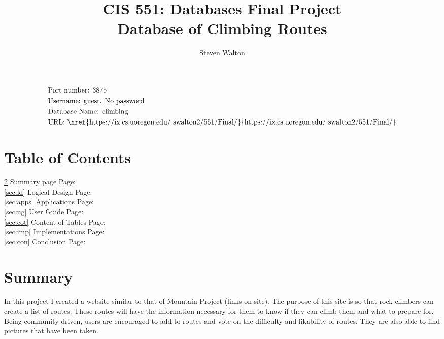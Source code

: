 \documentclass[12pt,letter]{article}
\begin{document}
\title{CIS 551: Databases Final Project\\
\large Database of Climbing Routes}
\author{Steven Walton}
\maketitle

\section*{}
\begin{align*}
    &\text{Port number: }3875 \\
    &\text{Username: guest. No password}\\
    &\text{Database Name: climbing}\\
    &\text{URL:
    \href{https://ix.cs.uoregon.edu/~swalton2/551/Final/}{https://ix.cs.uoregon.edu/~swalton2/551/Final/}}\\
\end{align*}
\newpage
\section{Table of Contents}
\ref{sec:sum} Summary page      \hspace*{\fill}Page:\pageref{sec:sum}\\
\ref{sec:ld} Logical Design     \hspace*{\fill}Page:\pageref{sec:ld}\\
\ref{sec:apps} Applications     \hspace*{\fill}Page:\pageref{sec:apps}\\
\ref{sec:ug} User Guide         \hspace*{\fill}Page:\pageref{sec:ug}\\
\ref{sec:cot} Content of Tables \hspace*{\fill}Page:\pageref{sec:cot}\\
\ref{sec:imp} Implementations   \hspace*{\fill}Page:\pageref{sec:imp}\\
\ref{sec:con} Conclusion        \hspace*{\fill}Page:\pageref{sec:con}

\section{Summary}\label{sec:sum}

In this project I created a website similar to that of Mountain Project (links
on site). The purpose of this site is so that rock climbers can create a list of
routes. These routes will have the information necessary for them to know if
they can climb them and what to prepare for. Being community driven, users are
encouraged to add to routes and vote on the difficulty and likability of routes. 
They are also able to find pictures that have been taken. 
\end{document}
